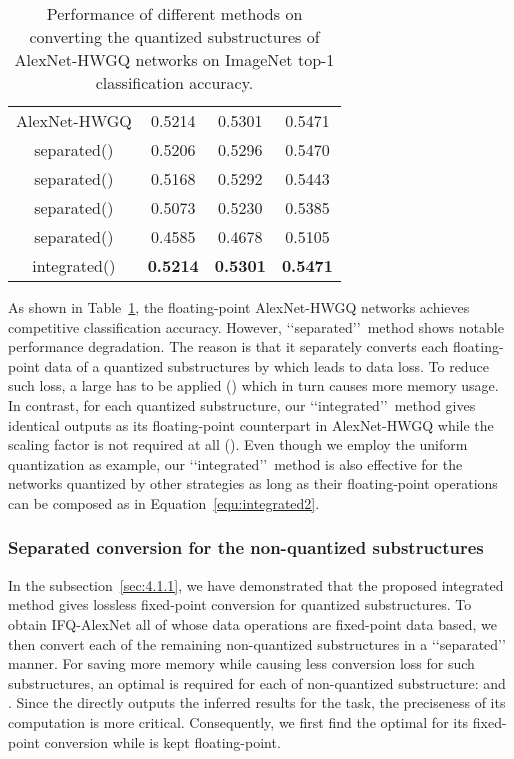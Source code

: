 \documentclass[10pt,twocolumn,letterpaper]{article}
\begin{document}
\begin{table}[!h]
\centering
\caption{Performance of different methods on converting the quantized substructures of AlexNet-HWGQ networks on ImageNet top-1 classification accuracy.}
\label{tab:fixdiffbits}
\begin{tabular}{c|c|c|c}

  \hline                               &  &  & \\
  \hline\hline     {AlexNet-HWGQ}             &0.5214 &0.5301 &0.5471 \\
   \hline          {separated()}  &0.5206 &0.5296 &0.5470 \\
                   {separated()}  &0.5168 &0.5292 &0.5443 \\
                   {separated()}   &0.5073 &0.5230 &0.5385 \\
                   {separated()}   &0.4585 &0.4678 &0.5105 \\
   \hline          {integrated()} &\textbf{0.5214} &\textbf{0.5301} &\textbf{0.5471} \\
  \hline
\end{tabular}
\end{table}



As shown in Table~\ref{tab:fixdiffbits}, the floating-point AlexNet-HWGQ networks achieves competitive classification accuracy. However, \lq\lq separated\rq\rq\, method shows notable performance degradation. The reason is that it separately converts each floating-point data  of a quantized substructures by  which leads to data loss. To reduce such loss, a large  has to be applied () which in turn causes more memory usage. In contrast, for each quantized substructure, our \lq\lq integrated\rq\rq\, method gives identical outputs as its floating-point counterpart in AlexNet-HWGQ while the scaling factor  is not required at all (). Even though we employ the uniform quantization as example, our \lq\lq integrated\rq\rq\, method is also effective for the networks quantized by other strategies as long as their floating-point operations can be composed as in Equation~\ref{equ:integrated2}.


\subsubsection{Separated conversion for the non-quantized substructures} \label{sec:4.1.2}

In the subsection~\ref{sec:4.1.1}, we have demonstrated that the proposed integrated method gives lossless fixed-point conversion for quantized substructures. To obtain IFQ-AlexNet all of whose data operations are fixed-point data based, we then convert each of the remaining non-quantized substructures in a \lq\lq separated\rq\rq\, manner. For saving more memory while causing less conversion loss for such substructures, an optimal  is required for each of non-quantized substructure:  and . Since the  directly outputs the inferred results for the task, the preciseness of its computation is more critical. Consequently, we first find the optimal  for its fixed-point conversion while  is kept floating-point.
\end{document}
